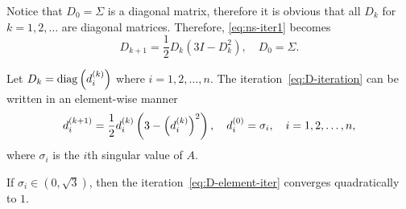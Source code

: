 \documentclass[12pt]{article}
\begin{document}
Notice that $D_0 = \Sigma$ is a diagonal matrix, therefore it is obvious that all $D_k$ for $k = 1,2,\dots$ are diagonal matrices. Therefore, \eqref{eq:ns-iter1} becomes 
\begin{equation}
    \label{eq:D-iteration}
    D_{k+1} = \frac{1}{2}D_k(3I - D_k^2),\quad D_0 = \Sigma.
\end{equation}

Let $D_k = \mathrm{diag}\left(d_i^{(k)}\right)$ where $i=1,2,\dots,n$. The iteration~\eqref{eq:D-iteration} can be written in an element-wise manner
\begin{equation}
    \label{eq:D-element-iter}
    d_i^{(k+1)} = \frac{1}{2}d_i^{(k)}\left(3-\left(d_i^{(k)}\right)^2\right),\quad d_i^{(0)} = \sigma_i, \quad i = 1,2,\dots,n,
\end{equation}
where $\sigma_i$ is the $i$th singular value of $A$.

\begin{lemma}\label{lemma:scalarNS}
    If $\sigma_i\in (0,\sqrt{3})$, then the iteration~\eqref{eq:D-element-iter} converges quadratically to $1$.
\end{lemma}
\end{document}
